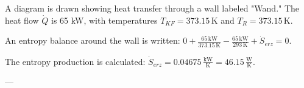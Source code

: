 A diagram is drawn showing heat transfer through a wall labeled "Wand." The heat flow \( \dot{Q} \) is 65 kW, with temperatures \( T_{KF} = 373.15 \, \text{K} \) and \( T_R = 373.15 \, \text{K} \).  

An entropy balance around the wall is written:  
\( 0 + \frac{65 \, \text{kW}}{373.15 \, \text{K}} - \frac{65 \, \text{kW}}{293 \, \text{K}} + \dot{S}_{erz} = 0 \).  

The entropy production is calculated:  
\( \dot{S}_{erz} = 0.04675 \, \frac{\text{kW}}{\text{K}} = 46.15 \, \frac{\text{W}}{\text{K}} \).  

---